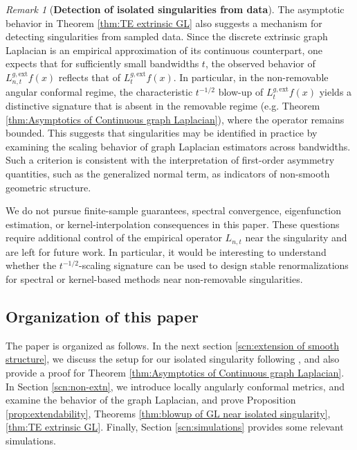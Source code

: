 \documentclass{amsart}
\let\oldcitet\citet
\renewcommand{\citet}[1]{\textcolor{blue}{\oldcitet{#1}}}
\theoremstyle{definition}
\theoremstyle{remark}
\newtheorem{remark}[theorem]{Remark}
\newcommand{\nd}{\noindent}
\newcommand{\0}{\boldsymbol{0}}
\begin{document}
\begin{remark}[\textbf{Detection of isolated singularities from data}]
\noindent
The asymptotic behavior in Theorem \ref{thm:TE extrinsic GL} also suggests a mechanism for detecting singularities from sampled data. Since the discrete extrinsic graph Laplacian is an empirical approximation of its continuous counterpart, one expects that for sufficiently small bandwidths $t$, the observed behavior of $L_{n,t}^{g,\mathrm{ext}}f(x)$ reflects that of $L_t^{g,\mathrm{ext}}f(x)$. In particular, in the non-removable angular conformal regime, the characteristic $t^{-1/2}$ blow-up of $L_t^{g,\mathrm{ext}}f(x)$ yields a distinctive signature that is absent in the removable regime (e.g. Theorem \ref{thm:Asymptotics of Continuous graph Laplacian}), where the operator remains bounded. This suggests that singularities may be identified in practice by examining the scaling behavior of graph Laplacian estimators across bandwidths. Such a criterion is consistent with the interpretation of first-order asymmetry quantities, such as the generalized normal term, as indicators of non-smooth geometric structure.
\end{remark}

We do not pursue finite-sample guarantees, spectral convergence, eigenfunction estimation, or kernel-interpolation consequences in this paper. These questions require additional control of the empirical operator \(L_{n,t}\) near the singularity and are left for future work. In particular, it would be interesting to understand whether the \(t^{-1/2}\)-scaling signature can be used to design stable renormalizations for spectral or kernel-based methods near non-removable singularities.



\subsection{Organization of this paper}

\nd The paper is organized as follows. In the next section \ref{scn:extension of smooth structure}, we discuss the setup for our isolated singularity following \citet{SmithYang1992}, and also provide a proof for Theorem \ref{thm:Asymptotics of Continuous graph Laplacian}. In Section \ref{scn:non-extn}, we introduce locally angularly conformal metrics, and examine the behavior of the graph Laplacian, and prove Proposition \ref{prop:extendability}, Theorems \ref{thm:blowup of GL near isolated singularity}, \ref{thm:TE extrinsic GL}. 
Finally, Section \ref{scn:simulations} provides some relevant simulations.
\end{document}
